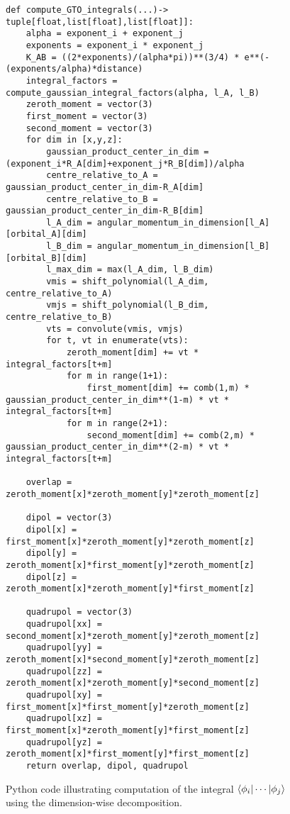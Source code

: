 \begin{figure}[H]
\begin{verbatim}
def compute_GTO_integrals(...)-> tuple[float,list[float],list[float]]:
    alpha = exponent_i + exponent_j
    exponents = exponent_i * exponent_j
    K_AB = ((2*exponents)/(alpha*pi))**(3/4) * e**(-(exponents/alpha)*distance)
    integral_factors = compute_gaussian_integral_factors(alpha, l_A, l_B)
    zeroth_moment = vector(3)
    first_moment = vector(3)
    second_moment = vector(3)
    for dim in [x,y,z]:
        gaussian_product_center_in_dim = (exponent_i*R_A[dim]+exponent_j*R_B[dim])/alpha
        centre_relative_to_A = gaussian_product_center_in_dim-R_A[dim]
        centre_relative_to_B = gaussian_product_center_in_dim-R_B[dim]
        l_A_dim = angular_momentum_in_dimension[l_A][orbital_A][dim]
        l_B_dim = angular_momentum_in_dimension[l_B][orbital_B][dim]
        l_max_dim = max(l_A_dim, l_B_dim)
        vmis = shift_polynomial(l_A_dim, centre_relative_to_A)
        vmjs = shift_polynomial(l_B_dim, centre_relative_to_B)
        vts = convolute(vmis, vmjs)
        for t, vt in enumerate(vts):
            zeroth_moment[dim] += vt * integral_factors[t+m]
            for m in range(1+1):
                first_moment[dim] += comb(1,m) * gaussian_product_center_in_dim**(1-m) * vt * integral_factors[t+m]
            for m in range(2+1):
                second_moment[dim] += comb(2,m) * gaussian_product_center_in_dim**(2-m) * vt * integral_factors[t+m]

    overlap = zeroth_moment[x]*zeroth_moment[y]*zeroth_moment[z]

    dipol = vector(3)
    dipol[x] = first_moment[x]*zeroth_moment[y]*zeroth_moment[z]
    dipol[y] = zeroth_moment[x]*first_moment[y]*zeroth_moment[z]
    dipol[z] = zeroth_moment[x]*zeroth_moment[y]*first_moment[z]

    quadrupol = vector(3)
    quadrupol[xx] = second_moment[x]*zeroth_moment[y]*zeroth_moment[z]
    quadrupol[yy] = zeroth_moment[x]*second_moment[y]*zeroth_moment[z]
    quadrupol[zz] = zeroth_moment[x]*zeroth_moment[y]*second_moment[z]
    quadrupol[xy] = first_moment[x]*first_moment[y]*zeroth_moment[z]
    quadrupol[xz] = first_moment[x]*zeroth_moment[y]*first_moment[z]
    quadrupol[yz] = zeroth_moment[x]*first_moment[y]*first_moment[z]
    return overlap, dipol, quadrupol
\end{verbatim}
    \caption{Python code illustrating computation of the integral $\braket{\phi_i|\cdots|\phi_j}$ using the dimension-wise decomposition.}
\end{figure}

